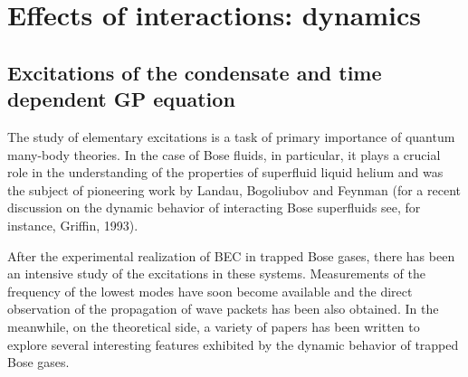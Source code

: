 \section{Effects of interactions: dynamics}
\label{sec:dynamics}


\subsection{Excitations of the condensate and time dependent GP equation}
\label{sec:TDGP}

The study of elementary excitations is a task of primary importance
of quantum many-body theories. In the case of Bose fluids,
in particular, it plays a crucial role in the understanding
of the properties of superfluid liquid helium and was the subject
of pioneering work by Landau, Bogoliubov and Feynman
(for a recent discussion on the dynamic behavior of interacting 
Bose superfluids see, for instance, Griffin, 1993).

After the experimental realization of BEC in  trapped Bose gases,
there has been an intensive study of the excitations
in these systems. Measurements of the frequency of the lowest
modes have soon become available and the direct observation of
the propagation of wave packets has been also obtained. In the
meanwhile, on the theoretical side, a variety of papers has
been written to explore several interesting features exhibited by
the dynamic behavior of trapped Bose gases.

